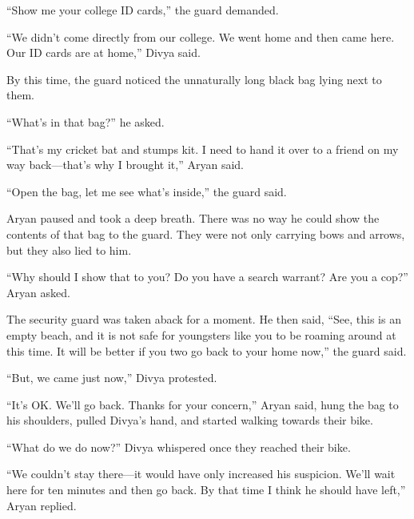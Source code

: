“Show me your college ID cards,” the guard demanded.

“We didn't come directly from our college. We went home and then came here. Our
ID cards are at home,” Divya said.

By this time, the guard noticed the unnaturally long black bag lying next to
them.

“What's in that bag?” he asked.

“That's my cricket bat and stumps kit. I need to hand it over to a friend on my
way back—that's why I brought it,” Aryan said.

“Open the bag, let me see what's inside,” the guard said.

Aryan paused and took a deep breath. There was no way he could show the contents
of that bag to the guard. They were not only carrying bows and arrows, but they
also lied to him.

“Why should I show that to you? Do you have a search warrant? Are you a cop?”
Aryan asked.

The security guard was taken aback for a moment. He then said, “See, this is an
empty beach, and it is not safe for youngsters like you to be roaming around at
this time. It will be better if you two go back to your home now,” the guard
said.

“But, we came just now,” Divya protested.

“It's OK. We'll go back. Thanks for your concern,” Aryan said, hung the bag to
his shoulders, pulled Divya's hand, and started walking towards their bike.

“What do we do now?” Divya whispered once they reached their bike.

“We couldn't stay there—it would have only increased his suspicion. We'll wait
here for ten minutes and then go back. By that time I think he should have
left,” Aryan replied.